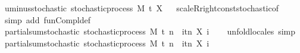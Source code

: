 \begin{isabellebody}
{\isafoldproof}%
%
\isadelimproof
\isanewline
%
\endisadelimproof
\isanewline
{}\isamarkupfalse%
\ uminus{\isacharunderscore}{\kern0pt}stochastic{\isacharcolon}{\kern0pt}\ {\isachardoublequoteopen}stochastic{\isacharunderscore}{\kern0pt}process\ M\ t\ {\isacharparenleft}{\kern0pt}{\isacharminus}{\kern0pt}X{\isacharparenright}{\kern0pt}{\isachardoublequoteclose}%
\isadelimproof
\ %
\endisadelimproof
%
\isatagproof
{}\isamarkupfalse%
\ scaleR{\isacharunderscore}{\kern0pt}right{\isacharunderscore}{\kern0pt}const{\isacharunderscore}{\kern0pt}stochastic{\isacharbrackleft}{\kern0pt}of\ {\isachardoublequoteopen}{\isasymlambda}{\isacharunderscore}{\kern0pt}{\isachardot}{\kern0pt}\ {\isacharminus}{\kern0pt}{}{\isachardoublequoteclose}{\isacharbrackright}{\kern0pt}\ \isamarkupfalse%
\ {\isacharparenleft}{\kern0pt}simp\ add{\isacharcolon}{\kern0pt}\ fun{\isacharunderscore}{\kern0pt}Compl{\isacharunderscore}{\kern0pt}def{\isacharparenright}{\kern0pt}%
\endisatagproof
{\isafoldproof}%
%
\isadelimproof
%
\endisadelimproof
\isanewline
\isanewline
{}\isamarkupfalse%
\ partial{\isacharunderscore}{\kern0pt}sum{\isacharunderscore}{\kern0pt}stochastic{\isacharcolon}{\kern0pt}\ {\isachardoublequoteopen}stochastic{\isacharunderscore}{\kern0pt}process\ M\ t\ {\isacharparenleft}{\kern0pt}{\isasymlambda}n\ {\isasymxi}{\isachardot}{\kern0pt}\ {\isasymSum}i{\isasymin}{\isacharbraceleft}{\kern0pt}tn{\isacharbraceright}{\kern0pt}{\isachardot}{\kern0pt}\ X\ i\ {\isasymxi}{\isacharparenright}{\kern0pt}{\isachardoublequoteclose}%
\isadelimproof
\ %
\endisadelimproof
%
\isatagproof
{}\isamarkupfalse%
\ {\isacharparenleft}{\kern0pt}unfold{\isacharunderscore}{\kern0pt}locales{\isacharparenright}{\kern0pt}\ simp%
\endisatagproof
{\isafoldproof}%
%
\isadelimproof
%
\endisadelimproof
\isanewline
\isanewline
{}\isamarkupfalse%
\ partial{\isacharunderscore}{\kern0pt}sum{\isacharprime}{\kern0pt}{\isacharunderscore}{\kern0pt}stochastic{\isacharcolon}{\kern0pt}\ {\isachardoublequoteopen}stochastic{\isacharunderscore}{\kern0pt}process\ M\ t\ {\isacharparenleft}{\kern0pt}{\isasymlambda}n\ {\isasymxi}{\isachardot}{\kern0pt}\ {\isasymSum}i{\isasymin}{\isacharbraceleft}{\kern0pt}tn{\isacharbraceright}{\kern0pt}{\isachardot}{\kern0pt}\ X\ i\ {\isasymxi}{\isacharparenright}{\kern0pt}{\isachardoublequoteclose}%

\end{isabellebody}
